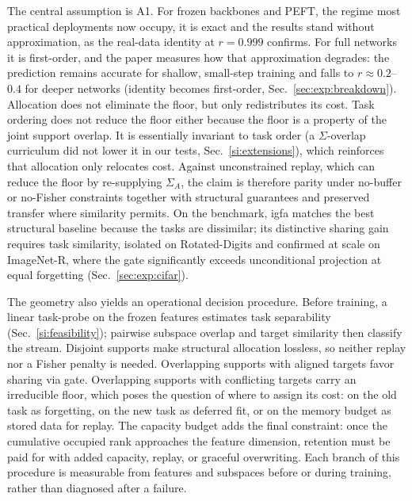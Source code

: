 \documentclass[10pt,a4paper]{article}
\theoremstyle{plain}
\theoremstyle{definition}
\newcommand{\Sig}{\Sigma}
\newcommand{\IGFA}{igfa}
\begin{document}
The central assumption is A1. For frozen backbones and PEFT, the regime most
practical deployments now occupy, it is exact and the results stand without
approximation, as the real-data identity at $r=0.999$ confirms. For full networks it is
first-order, and the paper measures how that approximation degrades: the
prediction remains accurate for shallow, small-step training and falls to
$r\approx0.2$--$0.4$ for deeper networks (identity becomes first-order, Sec.~\ref{sec:exp:breakdown}).
Allocation does not eliminate the floor, but only redistributes its cost.
Task ordering does not reduce the floor either because the floor is a property of the joint support
overlap. It is essentially invariant to task order (a $\Sig$-overlap curriculum did not lower it
in our tests, Sec.~\ref{si:extensions}), which reinforces that allocation only relocates cost.
Against unconstrained replay, which can reduce the floor by re-supplying $\Sig_A$, the
claim is therefore parity under no-buffer or
no-Fisher constraints together with structural guarantees and preserved transfer where
similarity permits. On the benchmark, \IGFA{} matches the best structural baseline because
the tasks are dissimilar; its distinctive sharing gain requires task similarity, isolated
on Rotated-Digits and confirmed at scale on ImageNet-R, where the gate significantly
exceeds unconditional projection at equal forgetting (Sec.~\ref{sec:exp:cifar}).

The geometry also yields an operational decision procedure. Before training, a linear
task-probe on the frozen features estimates task separability (Sec.~\ref{si:feasibility});
pairwise subspace overlap and target similarity then classify the stream. Disjoint supports
make structural allocation lossless, so neither replay nor a Fisher penalty is needed.
Overlapping supports with aligned targets favor sharing via gate. Overlapping
supports with conflicting targets carry an irreducible floor, which poses the question
of where to assign its cost: on the old task as forgetting, on the new task as deferred fit, or
on the memory budget as stored data for replay. The capacity budget adds the final
constraint: once the cumulative occupied rank approaches the feature dimension, retention
must be paid for with added capacity, replay, or graceful overwriting. Each branch of this
procedure is measurable from features and subspaces before or during training, rather than
diagnosed after a failure.
\end{document}
